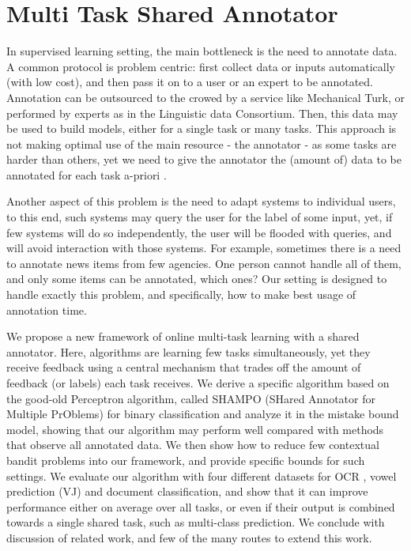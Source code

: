 
\section{Multi Task Shared Annotator}
\label{sec:selective_sampling}

 In supervised learning setting, the main bottleneck is the need to annotate data. A common protocol is 
 problem centric: first collect data or inputs automatically (with low cost), and then 
 pass it on to a user or an expert to be annotated. Annotation can be outsourced to the crowed by a 
 service like Mechanical Turk, or performed by experts as in the Linguistic data Consortium. Then, this data 
 may be used to build models, either for a single task or many tasks. This approach is not making optimal 
 use of the main resource - the annotator - as some tasks are harder than others, yet we need to give the 
 annotator the (amount of) data to be annotated for each task a-priori . 
 
 Another aspect of this problem is the need to adapt systems to individual users, to this end, 
 such systems may query the user for the label of some input, yet, if few systems will do so 
 independently, the user will be flooded with queries, and will avoid interaction with those systems. 
 For example, sometimes there is a need to annotate news items from few agencies. One person cannot 
 handle all of them, and only some items can be annotated, which ones? Our setting is designed to handle 
 exactly this problem, and specifically, how to make best usage of annotation time.
 
 We propose a new framework of online multi-task learning with a shared annotator. 
 Here, algorithms are learning few tasks simultaneously, yet they receive feedback using a central 
 mechanism that trades off the amount of feedback (or labels) each task receives. We derive a specific 
 algorithm based on the good-old Perceptron algorithm, called SHAMPO (SHared Annotator for Multiple 
 PrOblems) for binary classification and analyze it in the mistake bound model, showing that our algorithm 
 may perform well compared with methods that observe all annotated data. We then show how to reduce 
 few contextual bandit problems into our framework, and provide specific bounds for such 
settings. We evaluate our algorithm with four different datasets for OCR , vowel prediction (VJ) and 
document classification, and show that it can improve performance either on average over all tasks, 
or even if their output is combined towards a single shared task, such as multi-class prediction.
 We conclude with discussion of related work, and few of the many routes to extend this work.

